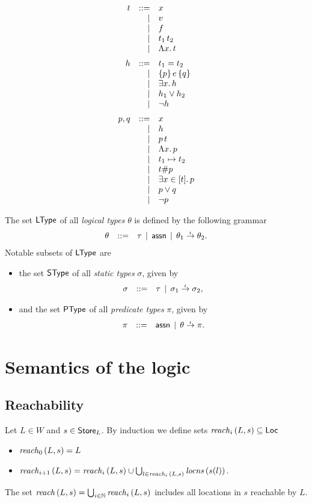 \documentclass[12pt,a4paper]{report}
\begin{document}
\[\GRbeg
  t \GRis x
    \GRal v
    \GRal f
    \GRal \app{t_1}{t_2}
    \GRal \tabstr{x}{t}
    \GRnl

  h \GRis t_1 = t_2
    \GRal \triple{p}{e}{q}
    \GRal \qex{x}{h}
    \GRal h_1 \vee h_2
    \GRal \neg h
    \GRnl

  p,q \GRis x
      \GRal h
      \GRal \app{p}{t}
      \GRal \tabstr{x}{p}
      \GRal t_1 \mapsto t_2
      \GRal t \# p
      \GRal \qbex{x}{t}{p}
      \GRal p \vee q
      \GRal \neg p
\GRend\]

The set $\mathsf{LType}$ of all {\em logical types} $\theta$ is defined
by the following grammar
\[\begin{array}{rrlll}
  \theta & ::= & \tau \,\mid\, \mathsf{assn} \,\mid\, \theta_1\stackrel{_t}{\to}\theta_2.
\end{array}\]
Notable subsets of $\mathsf{LType}$ are
\begin{itemize}
  \item the set $\mathsf{SType}$ of all {\em static types} $\sigma$, given by
        \[\begin{array}{rrlll}
          \sigma & ::= & \tau \,\mid\, \sigma_1\stackrel{_t}{\to}\sigma_2,
        \end{array}\]

  \item and the set $\mathsf{PType}$ of all {\em predicate types} $\pi$, given by
        \[\begin{array}{rrlll}
          \pi & ::= & \mathsf{assn} \,\mid\, \theta\stackrel{_t}{\to}\pi.
        \end{array}\]
\end{itemize}



\section{Semantics of the logic}



\subsection{Reachability}

\begin{definition}[Reachability]
  Let $L\in W$ and $s\in\mathsf{Store}_L$. By induction we define sets $\mathit{reach}_{i}\,(L,s) \subseteq \mathsf{Loc}$
  \begin{itemize}
    \item $\mathit{reach}_{0}\,(L,s) = L$
    \item $\mathit{reach}_{i+1}\,(L,s) = \mathit{reach}_{i}\,(L,s) \cup \bigcup_{l\in\mathit{reach}_{i}\,(L,s)} \mathit{locns}\,(s(l))$.
  \end{itemize}
  The set $\mathit{reach}\,(L,s) = \bigcup_{i\in\mathbb N} \mathit{reach}_{i}\,(L,s)$ includes all locations in $s$ reachable
  by $L$.
\end{definition}
\end{document}
